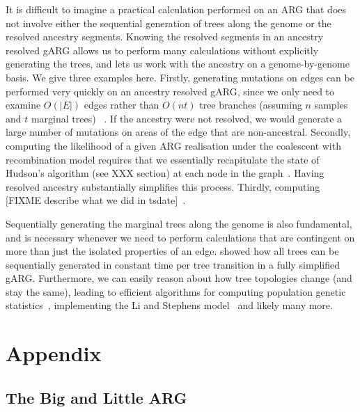 \documentclass{article}
\begin{document}
It is difficult to imagine a practical calculation performed on an
ARG that does not involve either the sequential generation of trees
along the genome or the resolved ancestry segments.
Knowing the resolved segments in an ancestry resolved gARG allows
us to perform many calculations without explicitly generating
the trees, and lets us work with the ancestry on a genome-by-genome
basis. We give three examples here. Firstly, generating mutations
on edges can be performed very quickly on an ancestry resolved
gARG, since we only need to examine $O(|E|)$ edges rather than
$O(nt)$ tree branches (assuming $n$ samples and $t$ marginal trees)
~\citep{baumdicker2021efficient}. If the ancestry were not resolved,
we would generate a large number of mutations on areas of the edge that
are non-ancestral. Secondly, computing the likelihood of a given
ARG realisation under the coalescent with recombination model
requires that we essentially recapitulate the state of Hudson's
algorithm (see XXX section) at each node in
the graph~\citep{baumdicker2021efficient}. Having resolved ancestry
substantially simplifies this process. Thirdly, computing
[FIXME describe what we did in tsdate]~\citep{wohns2022unified}.

Sequentially generating the marginal trees along the genome
is also fundamental, and is necessary whenever we need to
perform calculations that are contingent on more than just the
isolated properties of an edge. \cite{kelleher2016efficient}
showed how all trees can be sequentially generated in
constant time per tree transition in a fully simplified gARG.
Furthermore, we can easily reason about how tree topologies
change (and stay the same), leading to efficient algorithms
for computing population genetic
statistics~\citep{kelleher2016efficient,kelleher2018efficient},
implementing the Li and Stephens
model~\citep{kelleher2019inferring,wohns2022unified}
and likely many more.





\setcounter{secnumdepth}{2} %

\appendix
\section*{Appendix}

\subsection*{The Big and Little ARG}
\label{app-big-and-little-arg}
\end{document}
